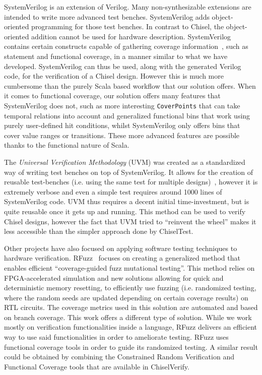 \documentclass[conference]{IEEEtran}
\begin{document}
SystemVerilog is an extension of Verilog. Many non-synthesizable extensions are intended
to write more advanced test benches. SystemVerilog adds object-oriented programming
for those test benches. In contrast to Chisel, the object-oriented addition cannot be
used for hardware description.
SystemVerilog contains certain constructs capable of gathering coverage information~\cite{spear2008systemverilog}, such as statement and functional coverage, in a manner similar to what we have developed. SystemVerilog can thus be used, along with the generated Verilog code, for the verification of a Chisel design. However this is much more cumbersome than the purely Scala based workflow that our solution offers. When it comes to functional coverage, our solution offers many features that SystemVerilog does not, such as more interesting \texttt{CoverPoints} that can take temporal relations into account and generalized functional bins that work using purely user-defined hit conditions, whilst SystemVerilog only offers bins that cover value ranges or transitions. These more advanced features are possible thanks to the functional nature of Scala. 

The \textit{Universal Verification Methodology} (UVM) was created as a standardized way of writing test benches on top of SystemVerilog. It allows for the creation of reusable test-benches (i.e. using the same test for multiple designs)~\cite{uvm2015}, however it is extremely verbose and even a simple test requires around 1000 lines of SystemVerilog code. UVM thus requires a decent initial time-investment, but is quite reusable once it gets up and running. This method can be used to verify Chisel designs, however the fact that UVM tried to ``reinvent the wheel'' makes it less accessible than the simpler approach done by ChiselTest.

Other projects have also focused on applying software testing techniques to hardware verification. RFuzz~\cite{rfuzz2018} focuses on creating a generalized method that enables efficient ``coverage-guided fuzz mutational testing''. This method relies on FPGA-accelerated simulation and new solutions allowing for quick and deterministic memory resetting, to efficiently use fuzzing (i.e. randomized testing, where the random seeds are updated depending on certain coverage results) on RTL circuits. The coverage metrics used in this solution are automated and based on branch coverage. This work offers a different type of solution. While we work mostly on verification functionalities inside a language, RFuzz delivers an efficient way to use said functionalities in order to ameliorate testing. RFuzz uses functional coverage tools in order to guide its randomized testing. A similar result could be obtained by combining the Constrained Random Verification and Functional Coverage tools that are available in ChiselVerify.
\end{document}
